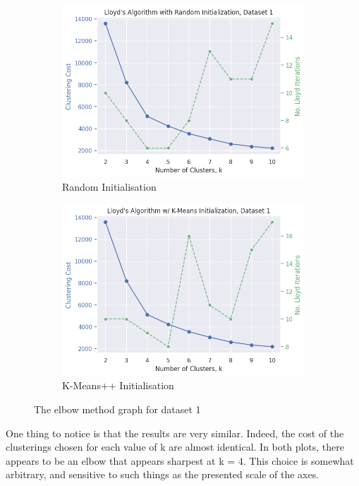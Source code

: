 \documentclass[12pt]{article}
\begin{document}
\begin{figure}[h]
    \centering
    \begin{subfigure}{0.5\textwidth}
      \centering
      \includegraphics[width=\linewidth]{4.png}
      \caption{Random Initialisation}
      \label{fig:4}
    \end{subfigure}%
    \hfill
    \begin{subfigure}{0.5\textwidth}
      \centering
      \includegraphics[width=\linewidth]{6.png}
      \caption{K-Means++ Initialisation}
      \label{fig:6}
    \end{subfigure}%
    \caption{The elbow method graph for dataset 1}
    \label{fig:elbow_1}
\end{figure}

One thing to notice is that the results are very similar. Indeed, the cost of the
clusterings chosen for each value of k are almost identical. In both plots, there
appears to be an elbow that appears sharpest at k = 4. This choice is somewhat
arbitrary, and sensitive to such things as the presented scale of the axes.
\end{document}
